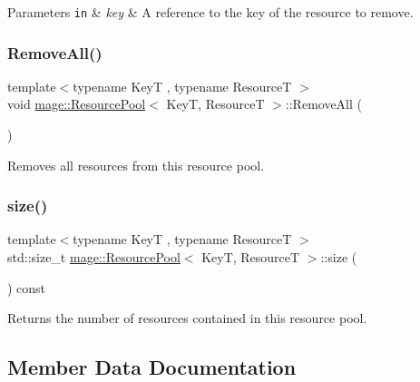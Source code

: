 \begin{DoxyParams}[1]{Parameters}
\mbox{\tt in}  & {\em key} & A reference to the key of the resource to remove. \\
\hline
\end{DoxyParams}
\mbox{\label{classmage_1_1_resource_pool_ab524641cccb1edbf761b94779b5ca5bc}} 
\subsubsection{\texorpdfstring{Remove\+All()}{RemoveAll()}}
{\footnotesize\ttfamily template$<$typename KeyT , typename ResourceT $>$ \\
void \mbox{\hyperlink{classmage_1_1_resource_pool}{mage\+::\+Resource\+Pool}}$<$ KeyT, ResourceT $>$\+::Remove\+All (\begin{DoxyParamCaption}{ }\end{DoxyParamCaption})\hspace{0.3cm}{\ttfamily [noexcept]}}

Removes all resources from this resource pool. \mbox{\label{classmage_1_1_resource_pool_ab9b3c0f117ed1118e93d4b677d535f92}} 
\subsubsection{\texorpdfstring{size()}{size()}}
{\footnotesize\ttfamily template$<$typename KeyT , typename ResourceT $>$ \\
std\+::size\+\_\+t \mbox{\hyperlink{classmage_1_1_resource_pool}{mage\+::\+Resource\+Pool}}$<$ KeyT, ResourceT $>$\+::size (\begin{DoxyParamCaption}{ }\end{DoxyParamCaption}) const\hspace{0.3cm}{\ttfamily [noexcept]}}

Returns the number of resources contained in this resource pool. 

\subsection{Member Data Documentation}
\mbox{\label{classmage_1_1_resource_pool_a3d6d7b0e2e9c3271f8ae3b7c2fa704ba}} 
